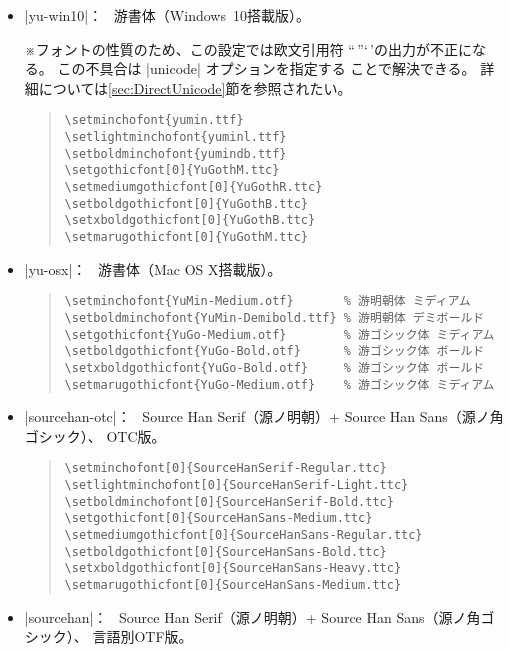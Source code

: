 \documentclass[uplatex,dvipdfmx,a4paper]{jsarticle}
\newcommand{\Note}{\par\noindent ※}
\newcommand{\Means}{：\ }
\begin{document}
\begin{itemize}
\item |yu-win10|\Means
  游書体（Windows~10搭載版）。
  \Note フォントの性質のため、この設定では欧文引用符
  “\,”‘\,’の出力が不正になる。
  この不具合は |unicode| オプションを指定する
  ことで解決できる。
  詳細については\ref{sec:DirectUnicode}節を参照されたい。

\begin{quote}\small\begin{verbatim}
\setminchofont{yumin.ttf}
\setlightminchofont{yuminl.ttf}
\setboldminchofont{yumindb.ttf}
\setgothicfont[0]{YuGothM.ttc}
\setmediumgothicfont[0]{YuGothR.ttc}
\setboldgothicfont[0]{YuGothB.ttc}
\setxboldgothicfont[0]{YuGothB.ttc}
\setmarugothicfont[0]{YuGothM.ttc}
\end{verbatim}\end{quote}

\item |yu-osx|\Means
  游書体（Mac OS X搭載版）。
\begin{quote}\small\begin{verbatim}
\setminchofont{YuMin-Medium.otf}       % 游明朝体 ミディアム
\setboldminchofont{YuMin-Demibold.ttf} % 游明朝体 デミボールド
\setgothicfont{YuGo-Medium.otf}        % 游ゴシック体 ミディアム
\setboldgothicfont{YuGo-Bold.otf}      % 游ゴシック体 ボールド
\setxboldgothicfont{YuGo-Bold.otf}     % 游ゴシック体 ボールド
\setmarugothicfont{YuGo-Medium.otf}    % 游ゴシック体 ミディアム
\end{verbatim}\end{quote}

\item |sourcehan-otc|\Means
  Source Han Serif（源ノ明朝）+ Source Han Sans（源ノ角ゴシック）、
  OTC版。

\begin{quote}\small\begin{verbatim}
\setminchofont[0]{SourceHanSerif-Regular.ttc}
\setlightminchofont[0]{SourceHanSerif-Light.ttc}
\setboldminchofont[0]{SourceHanSerif-Bold.ttc}
\setgothicfont[0]{SourceHanSans-Medium.ttc}
\setmediumgothicfont[0]{SourceHanSans-Regular.ttc}
\setboldgothicfont[0]{SourceHanSans-Bold.ttc}
\setxboldgothicfont[0]{SourceHanSans-Heavy.ttc}
\setmarugothicfont[0]{SourceHanSans-Medium.ttc}
\end{verbatim}\end{quote}

\item |sourcehan|\Means
  Source Han Serif（源ノ明朝）+ Source Han Sans（源ノ角ゴシック）、
  言語別OTF版。


\end{itemize}
\end{document}
